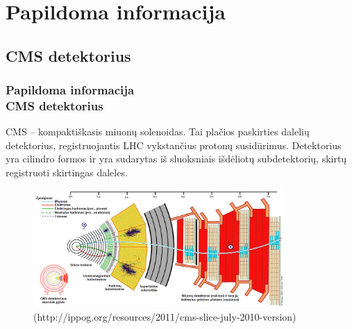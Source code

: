 \documentclass[xcolor=dvipsnames]{beamer}
\begin{document}
\section{Papildoma informacija}

\begin{frame}
\subsection{CMS detektorius}
\frametitle{Papildoma informacija\\ \small CMS detektorius}
CMS -- kompaktiškasis miuonų solenoidas. Tai plačios paskirties dalelių detektorius, registruojantis LHC vykstančius protonų susidūrimus. Detektorius yra cilindro formos ir yra sudarytas iš sluoksniais išdėliotų subdetektorių, skirtų registruoti skirtingas daleles.
\begin{figure}[H]
\includegraphics[width=0.85\textwidth]{CMSslice_LT.png}
\tiny (http://ippog.org/resources/2011/cms-slice-july-2010-version)
\end{figure}
\end{frame}
\end{document}
